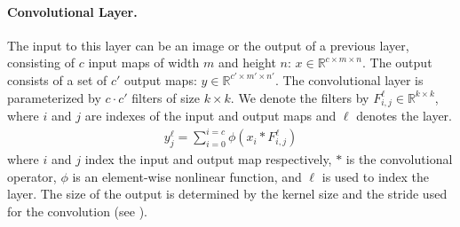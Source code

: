 \paragraph{Convolutional Layer.} The input to this layer can be an
image or the output of a previous layer, consisting of $c$ input maps
of width $m$ and height $n$: $x \in \mathbb{R}^{c \times m \times n}$.
The output consists of a set of $c'$ output maps: $y \in
\mathbb{R}^{c' \times m' \times
  n'}$. %
The convolutional layer is parameterized by $c \cdot c'$ filters of size $k \times k$.
We denote the filters by $F^\ell_{i, j} \in \mathbb{R}^{k \times k}$, where $i$ and $j$ are indexes of the input and output maps and
$\ell$ denotes the layer.
\begin{align}
\label{eq:conv}
y_j^\ell = \sum_{i=0}^{i=c}\phi (x_i \ast F_{i,j}^\ell)
\end{align}
\noindent
where $i$ and $j$ index the input and output map respectively, $\ast$
is the convolutional operator, $\phi$ is an element-wise nonlinear
function, and $\ell$ is used to index the layer.  The size of the
output is determined by the kernel size and the stride used for the
convolution (see \cite{goodfellow2013maxout}).




